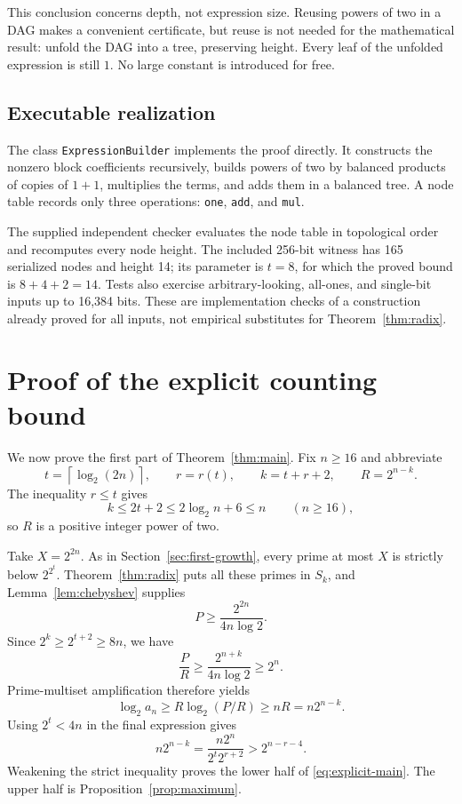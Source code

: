 \documentclass[11pt,a4paper]{article}
\theoremstyle{definition}
\theoremstyle{remark}
\renewcommand{\lg}{\log_2}
\newcommand{\ceil}[1]{\left\lceil #1\right\rceil}
\begin{document}
This conclusion concerns depth, not expression size. Reusing powers of
two in a DAG makes a convenient certificate, but reuse is not needed for
the mathematical result: unfold the DAG into a tree, preserving height.
Every leaf of the unfolded expression is still $1$. No large constant is
introduced for free.

\subsection{Executable realization}
The class \texttt{ExpressionBuilder} implements the proof directly.
It constructs the nonzero block coefficients recursively, builds powers
of two by balanced products of copies of $1+1$, multiplies the terms, and
adds them in a balanced tree. A node table records only three operations:
\texttt{one}, \texttt{add}, and \texttt{mul}.

The supplied independent checker evaluates the node table in topological
order and recomputes every node height. The included 256-bit witness has
165 serialized nodes and height 14; its parameter is $t=8$, for which the
proved bound is $8+4+2=14$. Tests also exercise arbitrary-looking,
all-ones, and single-bit inputs up to 16,384 bits. These are implementation
checks of a construction already proved for all inputs, not empirical
substitutes for Theorem~\ref{thm:radix}.

\section{Proof of the explicit counting bound}\label{sec:sharp-growth}
We now prove the first part of Theorem~\ref{thm:main}.
Fix $n\ge16$ and abbreviate
\[
 t=\ceil{\lg(2n)},\qquad r=r(t),\qquad k=t+r+2,
 \qquad R=2^{n-k}.
\]
The inequality $r\le t$ gives
\[
 k\le2t+2\le2\lg n+6\le n\qquad(n\ge16),
\]
so $R$ is a positive integer power of two.

Take $X=2^{2n}$. As in Section~\ref{sec:first-growth}, every prime at most
$X$ is strictly below $2^{2^t}$. Theorem~\ref{thm:radix} puts all these
primes in $S_k$, and Lemma~\ref{lem:chebyshev} supplies
\[
 P\ge\frac{2^{2n}}{4n\log2}.
\]
Since $2^k\ge2^{t+2}\ge8n$, we have
\[
 \frac{P}{R}\ge\frac{2^{n+k}}{4n\log2}\ge2^n.
\]
Prime-multiset amplification therefore yields
\begin{equation}\label{eq:amplified-final}
 \lg a_n\ge R\lg(P/R)\ge nR=n2^{n-k}.
\end{equation}
Using $2^t<4n$ in the final expression gives
\[
 n2^{n-k}
 =\frac{n2^n}{2^t2^{r+2}}
 >2^{n-r-4}.
\]
Weakening the strict inequality proves the lower half of
\eqref{eq:explicit-main}. The upper half is Proposition~\ref{prop:maximum}.
\end{document}

